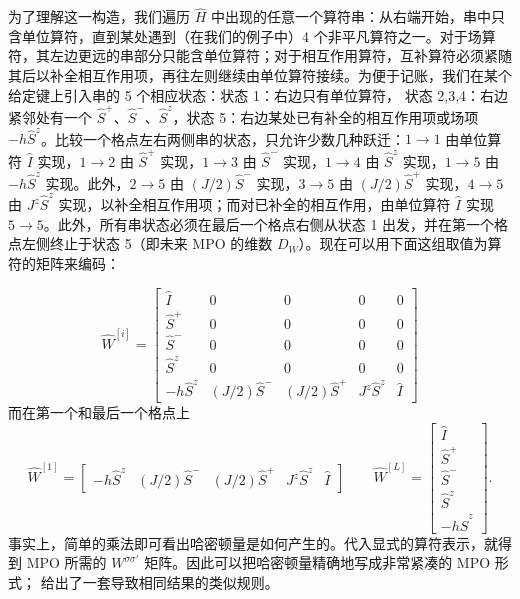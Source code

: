 为了理解这一构造，我们遍历 $\hat{H}$ 中出现的任意一个算符串：从右端开始，串中只含单位算符，直到某处遇到（在我们的例子中）4 个非平凡算符之一。对于场算符，其左边更远的串部分只能含单位算符；对于相互作用算符，互补算符必须紧随其后以补全相互作用项，再往左则继续由单位算符接续。为便于记账，我们在某个给定键上引入串的 5 个相应状态：状态 1：右边只有单位算符，
状态 2,3,4：右边紧邻处有一个 $\hat{S}^+$、$\hat{S}^-$、$\hat{S}^z$，状态 5：右边某处已有补全的相互作用项或场项 $-h\hat{S}^z$。比较一个格点左右两侧串的状态，只允许少数几种跃迁：$1 \rightarrow 1$ 由单位算符 $\hat{I}$ 实现，$1 \rightarrow 2$ 由 $\hat{S}^+$ 实现，$1 \rightarrow 3$ 由 $\hat{S}^-$ 实现，$1 \rightarrow 4$ 由 $\hat{S}^z$ 实现，$1 \rightarrow 5$ 由 $-h\hat{S}^z$ 实现。此外，$2\rightarrow 5$ 由 $(J/2)\hat{S}^-$ 实现，$3 \rightarrow 5$ 由 $(J/2)\hat{S}^+$ 实现，$4 \rightarrow 5$ 由 $J^z\hat{S}^z$ 实现，以补全相互作用项；而对已补全的相互作用，由单位算符 $\hat{I}$ 实现 $5 \rightarrow 5$。此外，所有串状态必须在最后一个格点右侧从状态 1 出发，并在第一个格点左侧终止于状态 5（即未来 MPO 的维数 $D_W$）。现在可以用下面这组取值为算符的矩阵来编码：

\begin{equation}
\hat{W}^{[i]} = \left[
\begin{array}{ccccc}
\hat{I} & 0 & 0 & 0 & 0 \\
\hat{S}^+ & 0 & 0 & 0 & 0 \\
\hat{S}^- & 0 & 0 & 0 & 0 \\
\hat{S}^z & 0 & 0 & 0 & 0 \\
-h\hat{S}^z & (J/2)\hat{S}^- & (J/2)\hat{S}^+ & J^z\hat{S}^z & \hat{I}
\end{array}
\right]
\end{equation}
而在第一个和最后一个格点上
\begin{equation}
\hat{W}^{[1]} = \left[
\begin{array}{ccccc}
-h\hat{S}^z & (J/2)\hat{S}^- & (J/2)\hat{S}^+ & J^z\hat{S}^z & \hat{I} 
\end{array}
\right]
\quad\quad 
\hat{W}^{[L]} = \left[
\begin{array}{c}
\hat{I} \\ \hat{S}^+ \\ \hat{S}^- \\ \hat{S}^z \\ -h\hat{S}^z 
\end{array}
\right] .
\end{equation}
事实上，简单的乘法即可看出哈密顿量是如何产生的。代入显式的算符表示，就得到 MPO 所需的 $W^{\sigma\sigma'}$ 矩阵。因此可以把哈密顿量精确地写成非常紧凑的 MPO 形式；\cite{Crosswhite08a} 给出了一套导致相同结果的类似规则。

